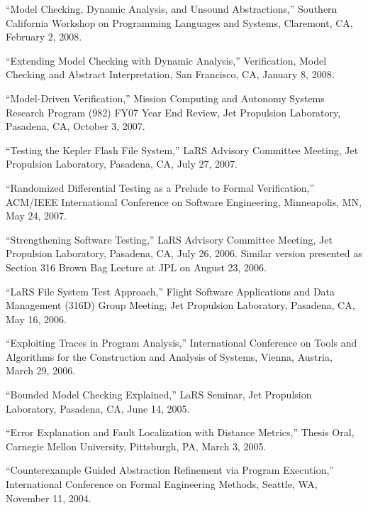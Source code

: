 \documentclass[ComputerScience]{vita}
\begin{document}
\begin{vita}
\begin{Selected Presentations}
\item ``Model Checking, Dynamic Analysis, and Unsound Abstractions,'' Southern California Workshop on Programming Languages and Systems, Claremont, CA, February 2, 2008.

\item ``Extending Model Checking with Dynamic Analysis,'' Verification, Model Checking and Abstract Interpretation, San Francisco, CA, January 8, 2008.

\item ``Model-Driven Verification,'' Mission Computing and Autonomy Systems Research Program (982) FY07 Year End Review, Jet Propulsion Laboratory, Pasadena, CA, October 3, 2007.

\item ``Testing the Kepler Flash File System,'' LaRS Advisory Committee Meeting, Jet Propulsion Laboratory, Pasadena, CA, July 27, 2007.

\item ``Randomized Differential Testing as a Prelude to Formal Verification,'' ACM/IEEE International Conference on Software Engineering, Minneapolis, MN, May 24, 2007.

\item ``Strengthening Software Testing,'' LaRS Advisory Committee Meeting, Jet Propulsion Laboratory, Pasadena, CA, July 26, 2006.  Similar version presented as Section 316 Brown Bag Lecture at JPL on August 23, 2006.

\item ``LaRS File System Test Approach,'' Flight Software Applications and Data Management (316D) Group Meeting, Jet Propulsion Laboratory, Pasadena, CA, May 16, 2006.



 \item ``Exploiting Traces in Program Analysis,'' International Conference on Tools and Algorithms for the Construction and Analysis of Systems, Vienna, Austria, March 29, 2006.


 \item ``Bounded Model Checking Explained,'' LaRS Seminar, Jet Propulsion Laboratory, Pasadena, CA, June 14, 2005.

 \item ``Error Explanation and Fault Localization with Distance Metrics,'' Thesis Oral, Carnegie Mellon University, Pittsburgh, PA, March 3, 2005.



  \item ``Counterexample Guided Abstraction Refinement via Program Execution,'' International Conference on Formal Engineering Methods, Seattle, WA, November 11, 2004.




\end{Selected Presentations}
\end{vita}
\end{document}
